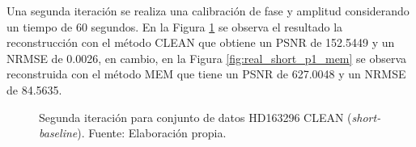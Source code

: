 Una segunda iteración se realiza una calibración de fase y amplitud considerando un tiempo de 60 segundos. En la Figura \ref{fig:real_short_p1_clean} se observa el resultado la reconstrucción con el método CLEAN que obtiene un PSNR de 152.5449 y un NRMSE de 0.0026, en cambio, en la Figura \ref{fig:real_short_p1_mem} se observa reconstruida con el método MEM que tiene un PSNR de 627.0048 y un NRMSE de 84.5635. 

\begin{figure}[!ht]
 \centering
    \vspace{0.3cm}
 \caption[Segunda iteración para conjunto de datos HD163296 CLEAN (\textit{short-baseline})]{Segunda iteración para conjunto de datos HD163296 CLEAN (\textit{short-baseline}). Fuente: Elaboración propia.}
 \label{fig:real_short_p1_clean}
\end{figure}

